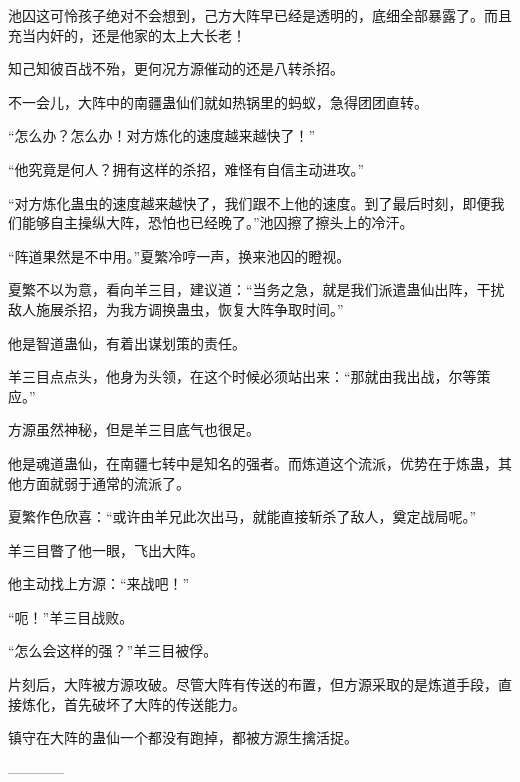 \begin{this_body}
池囚这可怜孩子绝对不会想到，己方大阵早已经是透明的，底细全部暴露了。而且充当内奸的，还是他家的太上大长老！

知己知彼百战不殆，更何况方源催动的还是八转杀招。

不一会儿，大阵中的南疆蛊仙们就如热锅里的蚂蚁，急得团团直转。

“怎么办？怎么办！对方炼化的速度越来越快了！”

“他究竟是何人？拥有这样的杀招，难怪有自信主动进攻。”

“对方炼化蛊虫的速度越来越快了，我们跟不上他的速度。到了最后时刻，即便我们能够自主操纵大阵，恐怕也已经晚了。”池囚擦了擦头上的冷汗。

“阵道果然是不中用。”夏繁冷哼一声，换来池囚的瞪视。

夏繁不以为意，看向羊三目，建议道：“当务之急，就是我们派遣蛊仙出阵，干扰敌人施展杀招，为我方调换蛊虫，恢复大阵争取时间。”

他是智道蛊仙，有着出谋划策的责任。

羊三目点点头，他身为头领，在这个时候必须站出来：“那就由我出战，尔等策应。”

方源虽然神秘，但是羊三目底气也很足。

他是魂道蛊仙，在南疆七转中是知名的强者。而炼道这个流派，优势在于炼蛊，其他方面就弱于通常的流派了。

夏繁作色欣喜：“或许由羊兄此次出马，就能直接斩杀了敌人，奠定战局呢。”

羊三目瞥了他一眼，飞出大阵。

他主动找上方源：“来战吧！”

“呃！”羊三目战败。

“怎么会这样的强？”羊三目被俘。

片刻后，大阵被方源攻破。尽管大阵有传送的布置，但方源采取的是炼道手段，直接炼化，首先破坏了大阵的传送能力。

镇守在大阵的蛊仙一个都没有跑掉，都被方源生擒活捉。

------------

\end{this_body}

